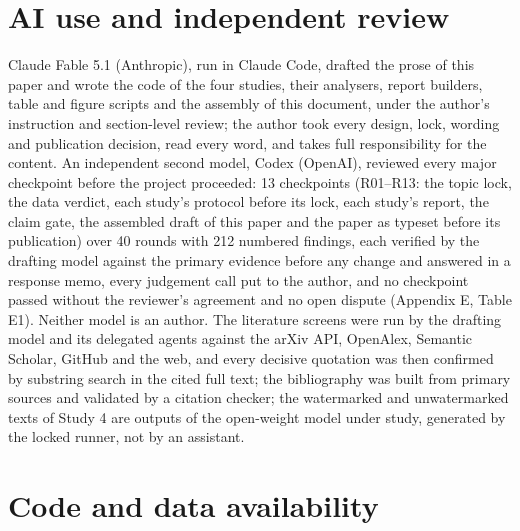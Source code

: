\documentclass[11pt,letterpaper]{article}
\begin{document}
\hypertarget{ai-use-and-independent-review}{%
\section*{AI use and independent review}\label{ai-use-and-independent-review}}

Claude Fable 5.1 (Anthropic), run in Claude Code, drafted the prose of this paper and wrote the code of the four studies, their analysers, report builders, table and figure scripts and the assembly of this document, under the author's instruction and section-level review; the author took every design, lock, wording and publication decision, read every word, and takes full responsibility for the content. An independent second model, Codex (OpenAI), reviewed every major checkpoint before the project proceeded: 13 checkpoints (R01--R13: the topic lock, the data verdict, each study's protocol before its lock, each study's report, the claim gate, the assembled draft of this paper and the paper as typeset before its publication) over 40 rounds with 212 numbered findings, each verified by the drafting model against the primary evidence before any change and answered in a response memo, every judgement call put to the author, and no checkpoint passed without the reviewer's agreement and no open dispute (Appendix E, Table E1). Neither model is an author. The literature screens were run by the drafting model and its delegated agents against the arXiv API, OpenAlex, Semantic Scholar, GitHub and the web, and every decisive quotation was then confirmed by substring search in the cited full text; the bibliography was built from primary sources and validated by a citation checker; the watermarked and unwatermarked texts of Study 4 are outputs of the open-weight model under study, generated by the locked runner, not by an assistant.

\hypertarget{code-and-data-availability}{%
\section*{Code and data availability}\label{code-and-data-availability}}
\end{document}
